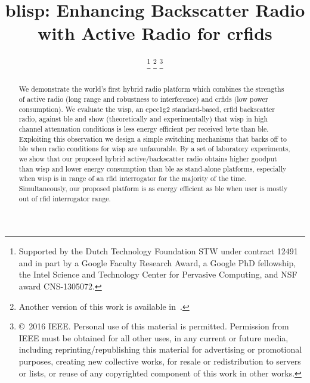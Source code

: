 \documentclass[conference,letterpaper,twoside,final,10pt]{IEEEtran}
\newcommand{\acresetwithnoexpand}{\acresetall
	\acused{gsm}
	\acused{rfid}
	\acused{rf}
	\acused{rn16}
}
\begin{document}
\title{\acs{blisp}: Enhancing Backscatter Radio with Active Radio for \aclp{crfid}}
\author{
\thanks{Supported by the Dutch Technology Foundation STW under contract 12491 and in part by a Google Faculty Research Award, a Google PhD fellowship, the Intel Science and Technology Center for Pervasive Computing, and NSF award CNS-1305072.}
\thanks{Another version of this work is available in~\cite{veen2015:thesis}.}
\thanks{\copyright~2016 IEEE. Personal use of this material is permitted. Permission from IEEE must be obtained for all other uses, in any current or future media, including reprinting/republishing this material for advertising or promotional purposes, creating new collective works, for resale or redistribution to servers or lists, or reuse of any copyrighted component of this work in other works.}
}

\maketitle

\acresetwithnoexpand
\begin{abstract}
We demonstrate the world's first hybrid radio platform which combines the strengths of active radio (long range and robustness to interference) and \aclp{crfid} (low power consumption).
We evaluate the \acf{wisp}, an \acs{epcc1g2} standard-based, \acl{crfid} backscatter radio, against \acf{ble} and show (theoretically and experimentally) that \acs{wisp} in high channel attenuation conditions is less energy efficient per received byte than \acs{ble}.
Exploiting this observation we design a simple switching mechanisms that backs off to \acs{ble} when radio conditions for \acs{wisp} are unfavorable.
By a set of laboratory experiments, we show that our proposed hybrid active/backscatter radio obtains higher goodput than \acs{wisp} and lower energy consumption than \acs{ble} as stand-alone platforms, especially when \acs{wisp} is in range of an \ac{rfid} interrogator for the majority of the time.
Simultaneously, our proposed platform is as energy efficient as \acs{ble} when user is mostly out of \ac{rfid} interrogator range.
\end{abstract}
\acresetwithnoexpand
\end{document}
